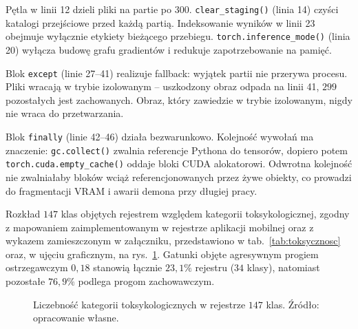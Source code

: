 Pętla w linii 12 dzieli pliki na partie po 300. \texttt{clear\_staging()} (linia 14) czyści katalogi przejściowe przed każdą partią. Indeksowanie wyników w linii 23 obejmuje wyłącznie etykiety bieżącego przebiegu. \texttt{torch.inference\_mode()} (linia 20) wyłącza budowę grafu gradientów i redukuje zapotrzebowanie na pamięć.

Blok \texttt{except} (linie 27--41) realizuje fallback: wyjątek partii nie przerywa procesu. Pliki wracają w trybie izolowanym – uszkodzony obraz odpada na linii 41, $299$ pozostałych jest zachowanych. Obraz, który zawiedzie w trybie izolowanym, nigdy nie wraca do przetwarzania.

Blok \texttt{finally} (linie 42--46) działa bezwarunkowo. Kolejność wywołań ma znaczenie: \texttt{gc.collect()} zwalnia referencje Pythona do tensorów, dopiero potem \texttt{torch.cuda.empty\_cache()} oddaje bloki CUDA alokatorowi. Odwrotna kolejność nie zwalniałaby bloków wciąż referencjonowanych przez żywe obiekty, co prowadzi do fragmentacji VRAM i awarii demona przy długiej pracy.

Rozkład $147$ klas objętych rejestrem względem kategorii toksykologicznej, zgodny z mapowaniem zaimplementowanym w rejestrze aplikacji mobilnej oraz z wykazem zamieszczonym w załączniku, przedstawiono w tab.~\ref{tab:toksycznosc} oraz, w ujęciu graficznym, na rys.~\ref{fig:rozklad_kategorii}. Gatunki objęte agresywnym progiem ostrzegawczym $0{,}18$ stanowią łącznie $23{,}1\%$ rejestru ($34$ klasy), natomiast pozostałe $76{,}9\%$ podlega progom zachowawczym.

\begin{figure}[htbp]
 \centering
 \caption{Liczebność kategorii toksykologicznych w rejestrze $147$ klas. Źródło: opracowanie własne.}
 \label{fig:rozklad_kategorii}
\end{figure}

